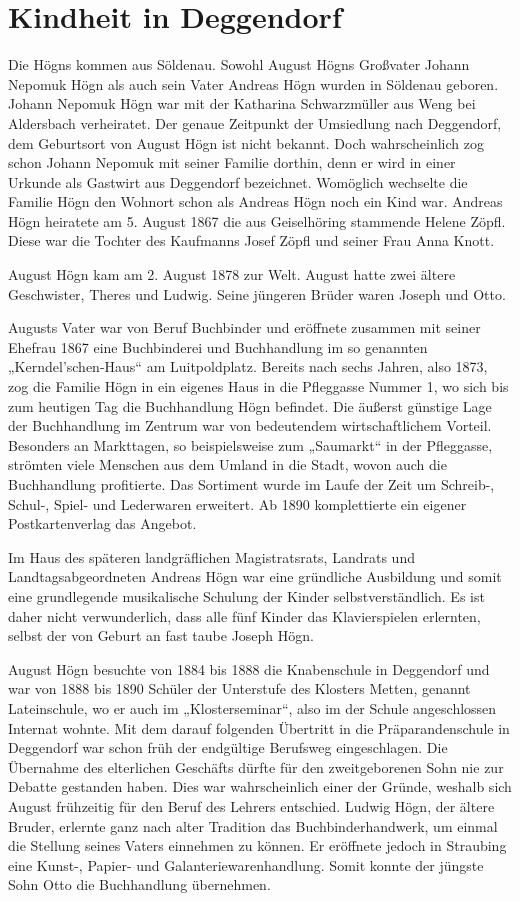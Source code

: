 \documentclass{book}
\begin{document}
\section{Kindheit in Deggendorf}

Die Högns kommen aus Söldenau. Sowohl August Högns Großvater Johann
Nepomuk Högn als auch sein Vater Andreas Högn wurden in Söldenau
gebo\-ren. Johann Nepomuk Högn war mit der Katharina Schwarzmüller aus
Weng bei Aldersbach verheiratet. Der genaue Zeitpunkt der Umsiedlung
nach Deg\-gendorf, dem Geburtsort von August Högn ist nicht bekannt.
Doch wahr\-scheinlich zog schon Johann Nepomuk mit seiner Familie
dorthin, denn er wird in einer Urkunde als Gastwirt aus Deggendorf
bezeichnet. Womöglich wechselte die Familie Högn den Wohnort schon als
Andreas Högn noch ein Kind war. Andreas Högn heiratete am 5. August
1867 die aus Geiselhöring stammende Helene Zöpfl. Diese war die Tochter
des Kaufmanns Josef Zöpfl und seiner Frau Anna Knott.

August Högn kam am 2. August 1878 zur Welt. August hatte zwei ältere
Geschwister, Theres und Ludwig. Seine jüngeren Brüder waren Joseph und
Otto.

Augusts Vater war von Beruf Buchbinder und eröffnete zusammen mit seiner
Ehefrau 1867 eine Buchbinderei und Buchhandlung im so genannten
„Kerndel’schen-Haus“ am Luitpoldplatz. Bereits nach sechs Jahren, also
1873, zog die Familie Högn in ein eigenes Haus in die Pfleggasse Nummer
1, wo sich bis zum heutigen Tag die Buchhandlung Högn befindet. Die
äußerst gün\-stige Lage der Buchhandlung im Zentrum war von bedeutendem
wirtschaftlichem Vorteil. Besonders an Markttagen, so beispielsweise
zum „Saumarkt“ in der Pfleggasse, strömten viele Menschen aus dem
Umland in die Stadt, wovon auch die Buchhandlung profitierte. Das
Sortiment wurde im Laufe der Zeit um Schreib-, Schul-, Spiel- und
Lederwaren erweitert. Ab 1890 komplettierte ein eigener
Postkartenverlag das Angebot.

Im Haus des späteren landgräflichen Magistratsrats, Landrats und
Land\-tagsabgeordneten Andreas Högn war eine gründliche Ausbildung und
somit eine grundlegende musikalische Schulung der Kinder
selbstverständlich. Es ist daher nicht verwunderlich, dass alle fünf
Kinder das Klavierspielen erlernten, selbst der von Geburt an fast
taube Joseph Högn.

August Högn besuchte von 1884 bis 1888 die Knabenschule in Deggen\-dorf
und war von 1888 bis 1890 Schüler der Unterstufe des Klosters Metten,
genannt Lateinschule, wo er auch im „Klosterseminar“, also im der
Schule angeschlossen Internat wohnte. Mit dem darauf folgenden
Übertritt in die Präparandenschule in Deggendorf war schon früh der
endgültige Berufsweg eingeschlagen. Die Übernahme des elterlichen
Geschäfts dürfte für den zweitgeborenen Sohn nie zur Debatte gestanden
haben. Dies war wahrscheinlich einer der Gründe, weshalb sich August
frühzeitig für den Beruf des Lehrers entschied. Ludwig Högn, der ältere
Bruder, erlernte ganz nach alter Tradition das Buchbinderhandwerk, um
einmal die Stellung seines Vaters einnehmen zu können. Er eröffnete
jedoch in Straubing eine Kunst-, Papier- und Galanteriewarenhandlung.
Somit konnte der jüngste Sohn Otto die Buchhandlung übernehmen.
\end{document}
